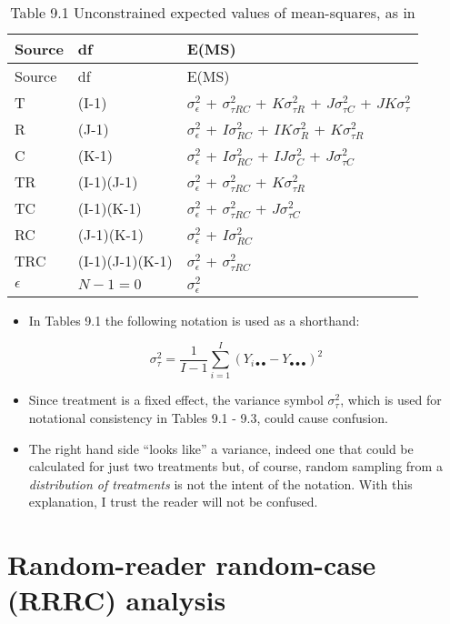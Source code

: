 \documentclass[
]{book}
\providecommand{\tightlist}{%
  \setlength{\itemsep}{0pt}\setlength{\parskip}{0pt}}
\begin{document}
\begin{longtable}[]{@{}lll@{}}
\caption{Table 9.1 Unconstrained expected values of mean-squares, as in \citep{RN2079}}\tabularnewline
\toprule
Source & df & E(MS)\tabularnewline
\midrule
\endfirsthead
\toprule
Source & df & E(MS)\tabularnewline
\midrule
\endhead
T & (I-1) & \(\sigma_{\epsilon}^{2}\) + \(\sigma_{\tau RC}^{2}\) + \(K\sigma_{\tau R}^{2}\) + \(J\sigma_{\tau C}^{2}\) + \(JK\sigma_{\tau}^{2}\)\tabularnewline
R & (J-1) & \(\sigma_{\epsilon}^{2}\) + \(I\sigma_{RC}^{2}\) + \(IK\sigma_{R}^{2}\) + \(K\sigma_{\tau R}^{2}\)\tabularnewline
C & (K-1) & \(\sigma_{\epsilon}^{2}\) + \(I\sigma_{RC}^{2}\) + \(IJ\sigma_{C}^{2}\) + \(J\sigma_{\tau C}^{2}\)\tabularnewline
TR & (I-1)(J-1) & \(\sigma_{\epsilon}^{2}\) + \(\sigma_{\tau RC}^{2}\) + \(K\sigma_{\tau R}^{2}\)\tabularnewline
TC & (I-1)(K-1) & \(\sigma_{\epsilon}^{2}\) + \(\sigma_{\tau RC}^{2}\) + \(J\sigma_{\tau C}^{2}\)\tabularnewline
RC & (J-1)(K-1) & \(\sigma_{\epsilon}^{2}\) + \(I\sigma_{RC}^{2}\)\tabularnewline
TRC & (I-1)(J-1)(K-1) & \(\sigma_{\epsilon}^{2}\) + \(\sigma_{\tau RC}^{2}\)\tabularnewline
\(\epsilon\) & \(N-1=0\) & \(\sigma_{\epsilon}^{2}\)\tabularnewline
\bottomrule
\end{longtable}

\begin{itemize}
\tightlist
\item
  In Tables 9.1 the following notation is used as a shorthand:
\end{itemize}

\begin{equation}
\sigma_{\tau}^{2}=\frac{1}{I-1}\sum_{i=1}^{I}\left ( Y_{i \bullet \bullet} - Y_{\bullet \bullet \bullet} \right )^2
\label{eq:defnVarTau}
\end{equation}

\begin{itemize}
\item
  Since treatment is a fixed effect, the variance symbol \(\sigma_{\tau}^{2}\), which is used for notational consistency in Tables 9.1 - 9.3, could cause confusion.
\item
  The right hand side ``looks like'' a variance, indeed one that could be calculated for just two treatments but, of course, random sampling from a \emph{distribution of treatments} is not the intent of the notation. With this explanation, I trust the reader will not be confused.
\end{itemize}

\hypertarget{random-reader-random-case-rrrc-analysis}{%
\section{Random-reader random-case (RRRC) analysis}\label{random-reader-random-case-rrrc-analysis}}
\end{document}
